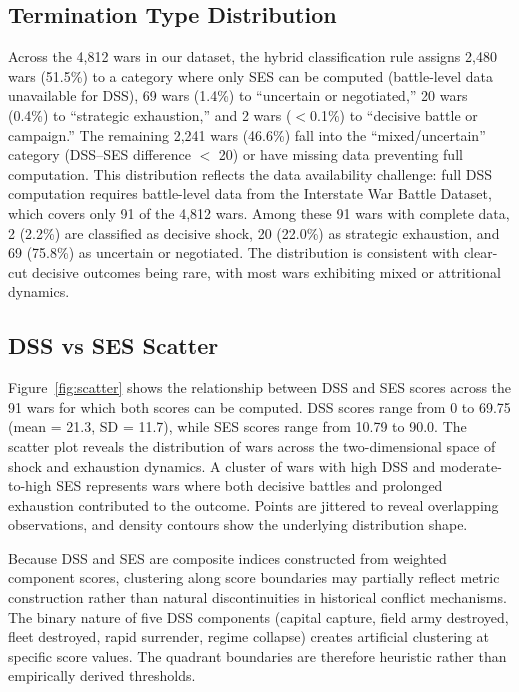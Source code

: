 \subsection{Termination Type Distribution}

Across the 4,812 wars in our dataset, the hybrid classification rule assigns 2,480 wars (51.5\%) to a category where only SES can be computed (battle-level data unavailable for DSS), 69 wars (1.4\%) to ``uncertain or negotiated,'' 20 wars (0.4\%) to ``strategic exhaustion,'' and 2 wars ($<$0.1\%) to ``decisive battle or campaign.'' The remaining 2,241 wars (46.6\%) fall into the ``mixed/uncertain'' category (DSS--SES difference $<$ 20) or have missing data preventing full computation. This distribution reflects the data availability challenge: full DSS computation requires battle-level data from the Interstate War Battle Dataset, which covers only 91 of the 4,812 wars. Among these 91 wars with complete data, 2 (2.2\%) are classified as decisive shock, 20 (22.0\%) as strategic exhaustion, and 69 (75.8\%) as uncertain or negotiated. The distribution is consistent with clear-cut decisive outcomes being rare, with most wars exhibiting mixed or attritional dynamics.

\subsection{DSS vs SES Scatter}

Figure~\ref{fig:scatter} shows the relationship between DSS and SES scores across the 91 wars for which both scores can be computed. DSS scores range from 0 to 69.75 (mean = 21.3, SD = 11.7), while SES scores range from 10.79 to 90.0. The scatter plot reveals the distribution of wars across the two-dimensional space of shock and exhaustion dynamics. A cluster of wars with high DSS and moderate-to-high SES represents wars where both decisive battles and prolonged exhaustion contributed to the outcome. Points are jittered to reveal overlapping observations, and density contours show the underlying distribution shape.

Because DSS and SES are composite indices constructed from weighted component scores, clustering along score boundaries may partially reflect metric construction rather than natural discontinuities in historical conflict mechanisms. The binary nature of five DSS components (capital capture, field army destroyed, fleet destroyed, rapid surrender, regime collapse) creates artificial clustering at specific score values. The quadrant boundaries are therefore heuristic rather than empirically derived thresholds.

